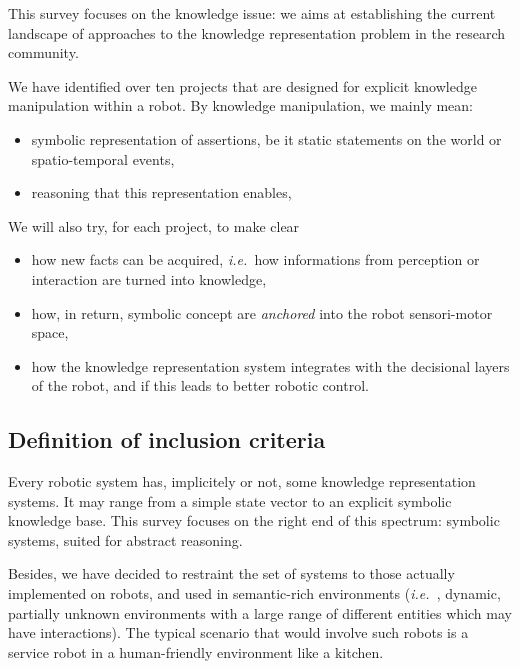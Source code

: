 \documentclass[a4paper]{article}
\newcommand{\ie}{{\textit{i.e.~}}}
\begin{document}
This survey focuses on the knowledge issue: we aims at establishing the current
landscape of approaches to the knowledge representation problem in the research
community.

We have identified over ten projects that are designed for explicit knowledge
manipulation within a robot. By knowledge manipulation, we mainly mean:

\begin{itemize}

	\item symbolic representation of assertions, be it static statements on the
	world or spatio-temporal events,

	\item reasoning that this representation enables,

\end{itemize}

We will also try, for each project, to make clear

\begin{itemize}

	\item how new facts can be acquired, \ie how informations from perception
	or interaction are turned into knowledge,

	\item how, in return, symbolic concept are \emph{anchored} into the robot
	sensori-motor space,

	\item how the knowledge representation system integrates with the
	decisional layers of the robot, and if this leads to better robotic
	control.

\end{itemize}


\subsection{Definition of inclusion criteria}
\label{sect|inclusion-criteria}

Every robotic system has, implicitely or not, some knowledge representation
systems. It may range from a simple state vector to an explicit symbolic
knowledge base.  This survey focuses on the right end of this spectrum:
symbolic systems, suited for abstract reasoning.

Besides, we have decided to restraint the set of systems to those actually
implemented on robots, and used in semantic-rich environments (\ie , dynamic,
partially unknown environments with a large range of different entities which
may have interactions). The typical scenario that would involve such robots is
a service robot in a human-friendly environment like a kitchen.
\end{document}
